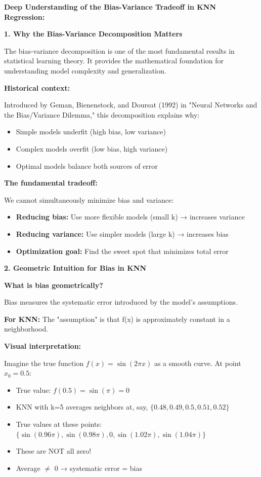\documentclass[12pt]{article}
\begin{document}
\begin{explanation}
\textbf{Deep Understanding of the Bias-Variance Tradeoff in KNN Regression:}

\textbf{1. Why the Bias-Variance Decomposition Matters}

The bias-variance decomposition is one of the most fundamental results in statistical learning theory. It provides the mathematical foundation for understanding model complexity and generalization.

\textbf{Historical context:}

Introduced by Geman, Bienenstock, and Doursat (1992) in "Neural Networks and the Bias/Variance Dilemma," this decomposition explains why:
\begin{itemize}
    \item Simple models underfit (high bias, low variance)
    \item Complex models overfit (low bias, high variance)
    \item Optimal models balance both sources of error
\end{itemize}

\textbf{The fundamental tradeoff:}

We cannot simultaneously minimize bias and variance:
\begin{itemize}
    \item \textbf{Reducing bias:} Use more flexible models (small k) → increases variance
    \item \textbf{Reducing variance:} Use simpler models (large k) → increases bias
    \item \textbf{Optimization goal:} Find the sweet spot that minimizes total error
\end{itemize}

\textbf{2. Geometric Intuition for Bias in KNN}

\textbf{What is bias geometrically?}

Bias measures the systematic error introduced by the model's assumptions.

\textbf{For KNN:} The "assumption" is that f(x) is approximately constant in a neighborhood.

\textbf{Visual interpretation:}

Imagine the true function $f(x) = \sin(2\pi x)$ as a smooth curve. At point $x_0 = 0.5$:
\begin{itemize}
    \item True value: $f(0.5) = \sin(\pi) = 0$
    \item KNN with k=5 averages neighbors at, say, $\{0.48, 0.49, 0.5, 0.51, 0.52\}$
    \item True values at these points: $\{\sin(0.96\pi), \sin(0.98\pi), 0, \sin(1.02\pi), \sin(1.04\pi)\}$
    \item These are NOT all zero!
    \item Average $\neq$ 0 → systematic error = bias
\end{itemize}


\end{explanation}
\end{document}
